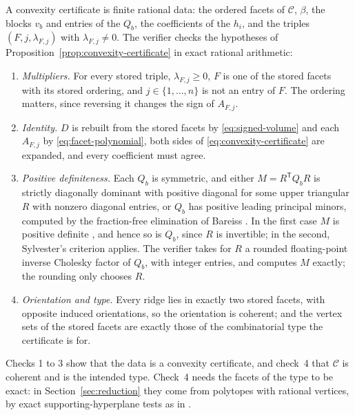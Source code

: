 A convexity certificate is finite rational data: the ordered facets of
$\mathcal{C}$, $\beta$, the blocks $v_{b}$ and entries of the $Q_{b}$, the
coefficients of the $h_{i}$, and the triples $(F, j, \lambda_{F,j})$ with
$\lambda_{F,j} \neq 0$. The verifier checks the hypotheses of
Proposition~\ref{prop:convexity-certificate} in exact rational arithmetic:
\begin{enumerate}
  \item \emph{Multipliers.} For every stored triple, $\lambda_{F,j} \geq 0$,
    $F$ is one of the stored facets with its stored ordering, and
    $j \in \{1, \ldots, n\}$ is not an entry of $F$. The ordering matters,
    since reversing it changes the sign of $A_{F,j}$.
  \item \emph{Identity.} $D$ is rebuilt from the stored facets by
    \eqref{eq:signed-volume} and each $A_{F,j}$ by
    \eqref{eq:facet-polynomial}, both sides of
    \eqref{eq:convexity-certificate} are expanded, and every coefficient
    must agree.
  \item \emph{Positive definiteness.} Each $Q_{b}$ is symmetric, and either
    $M = R^{\mathsf{T}} Q_{b} R$ is strictly diagonally dominant with
    positive diagonal for some upper triangular $R$ with nonzero diagonal
    entries, or $Q_{b}$ has positive leading principal minors, computed by
    the fraction-free elimination of Bareiss \cite{bareiss-1968}. In the
    first case $M$ is positive definite
    \cite[Theorem~6.1.10(c)]{horn-johnson-2013}, and hence so is $Q_{b}$, since
    $R$ is invertible; in the second, Sylvester's criterion
    \cite[Theorem~7.2.5]{horn-johnson-2013} applies. The verifier takes for
    $R$ a rounded floating-point inverse Cholesky factor of $Q_{b}$, with
    integer entries, and computes $M$ exactly; the rounding only chooses $R$.
  \item \emph{Orientation and type.} Every ridge lies in exactly two stored
    facets, with opposite induced orientations, so the orientation is
    coherent; and the vertex sets of the stored facets are exactly those of
    the combinatorial type the certificate is for.
\end{enumerate}
Checks 1 to 3 show that the data is a convexity certificate, and check~4
that $\mathcal{C}$ is coherent and is the intended type. Check~4 needs the
facets of the type to be exact: in Section~\ref{sec:reduction} they come
from polytopes with rational vertices, by exact supporting-hyperplane tests
as in \cite[Lemma~6.1]{medgyes-maxvol-d4-n9}.
